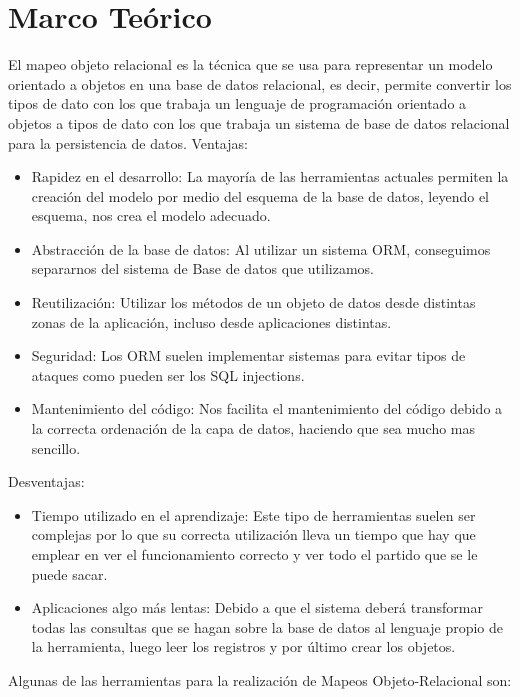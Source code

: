 \documentclass[%
 reprint,
 amsmath,amssymb,
 aps,
]{revtex4-1}
\begin{document}
\section {Marco Teórico}\label{sec:3}
El mapeo objeto relacional es la técnica que se usa para representar un modelo orientado a objetos en una base de datos relacional, es decir, permite convertir los tipos de dato con los que trabaja un lenguaje de programación orientado a objetos a tipos de dato con los que trabaja un sistema de base de datos relacional para la persistencia de datos.
\newline
Ventajas:
\begin{itemize}
	\item Rapidez en el desarrollo: La mayoría de las herramientas actuales permiten la creación del modelo por medio del esquema de la base de datos, leyendo el esquema, nos crea el modelo adecuado.
	\item Abstracción de la base de datos: Al utilizar un sistema ORM, conseguimos separarnos del sistema de Base de datos que utilizamos.
	\item Reutilización: Utilizar los métodos de un objeto de datos desde distintas zonas de la aplicación, incluso desde aplicaciones distintas.
	\item Seguridad: Los ORM suelen implementar sistemas para evitar tipos de ataques como pueden ser los SQL injections.
	\item Mantenimiento del código: Nos facilita el mantenimiento del código debido a la correcta ordenación de la capa de datos, haciendo que sea mucho mas sencillo.
\end{itemize}
Desventajas:
\begin{itemize}
	\item Tiempo utilizado en el aprendizaje: Este tipo de herramientas suelen ser complejas por lo que su correcta utilización lleva un tiempo que hay que emplear en ver el funcionamiento correcto y ver todo el partido que se le puede sacar.
	\item Aplicaciones algo más lentas: Debido a que el sistema deberá transformar todas las consultas que se hagan sobre la base de datos al lenguaje propio de la herramienta, luego leer los registros y por último crear los objetos.
\end{itemize}

Algunas de las herramientas para la realización de Mapeos Objeto-Relacional son:
\end{document}
